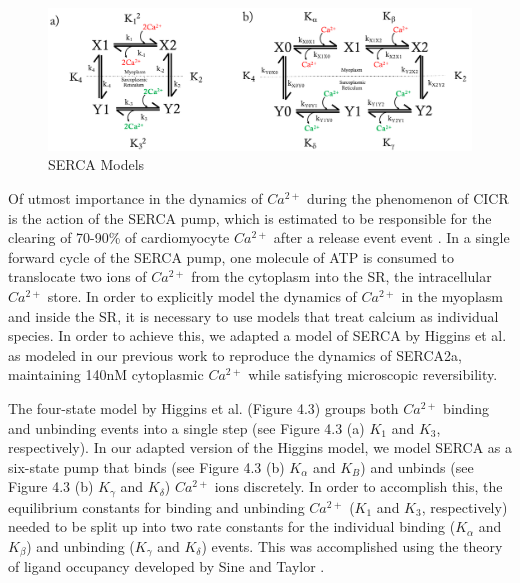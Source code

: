 \documentclass[12pt]{ucsddissertation}
\begin{document}
\setcounter{figure}{2}
\begin{figure}
\centering
	\includegraphics[scale=0.73]{SERCA2_fig.png}
	\caption{SERCA Models}
\label{fig:SERCAHiggins} 
\end{figure}


 Of utmost importance in the dynamics of $Ca^{2+}$ during the phenomenon of CICR is the action of the SERCA pump, which is estimated to be responsible for the clearing of 70-90\% of cardiomyocyte $Ca^{2+}$ after a release event event \cite{Bers2002}. In a single forward cycle of the SERCA pump, one molecule of ATP is consumed to translocate two ions of $Ca^{2+}$ from the cytoplasm into the SR, the intracellular $Ca^{2+}$ store.  In order to explicitly model the dynamics of $Ca^{2+}$ in the myoplasm and inside the SR, it is necessary to use models that treat calcium as individual species. In order to achieve this, we adapted a model of SERCA by Higgins et al. \cite{Higgins2006} as modeled in our previous work \cite{Bartol2015} to reproduce the dynamics of SERCA2a, maintaining 140nM cytoplasmic $Ca^{2+}$ while satisfying microscopic reversibility. 

The four-state model by Higgins et al. \cite{Higgins2006} (Figure 4.3) groups both $Ca^{2+}$ binding and unbinding events into a single step (see Figure 4.3 (a) $K_{1}$ and $K_{3}$, respectively). In our adapted version of the Higgins model, we model SERCA as a six-state pump that binds (see Figure 4.3 (b) $K_{\alpha}$ and $K_{B}$) and unbinds (see Figure 4.3 (b) $K_{\gamma}$ and $K_{\delta}$) $Ca^{2+}$ ions discretely. In order to accomplish this, the equilibrium constants for binding and unbinding $Ca^{2+}$  ($K_{1}$ and $K_{3}$, respectively) needed to be split up into two rate constants for the individual binding ($K_{\alpha}$ and $K_{\beta}$) and unbinding ($K_{\gamma}$ and $K_{\delta}$) events. This was accomplished using the theory of ligand occupancy developed by Sine and Taylor \cite{Sine1979,Sine1980,Sine1981}. 
\end{document}
